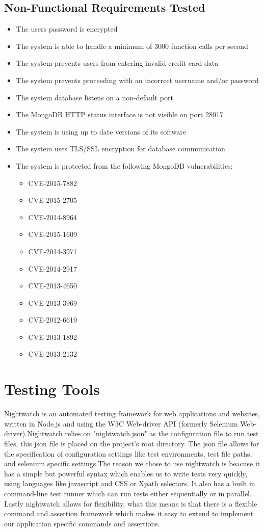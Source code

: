 \documentclass[12pt]{article}
\begin{document}
	\subsection{Non-Functional Requirements Tested}
	\begin{itemize}
		\item The users password is encrypted
		\item The system is able to handle a minimum of 3000 function calls per second
		\item The system prevents users from entering invalid credit card data
		\item The system prevents proceeding with an incorrect username and/or password
		\item The system database listens on a non-default port
		\item The MongoDB HTTP status interface is not visible on port 28017
		\item The system is using up to date versions of its software
		\item The system uses TLS/SSL encryption for database communication
		\item The system is protected from the following MongoDB vulnerabilities:
			\begin{itemize}
				\item CVE-2015-7882
				\item CVE-2015-2705
				\item CVE-2014-8964
				\item CVE-2015-1609
				\item CVE-2014-3971
				\item CVE-2014-2917
				\item CVE-2013-4650
				\item CVE-2013-3969
				\item CVE-2012-6619
				\item CVE-2013-1892
				\item CVE-2013-2132
			\end{itemize}
	\end{itemize}
	
	\section{Testing Tools}
	Nightwatch is an automated testing framework for web applications and websites, written in Node.js and using the W3C Web-driver API (formerly Selenium Web-driver).Nightwatch relies on "nightwatch.json" as the configuration file to run test files, this json file is placed on the project's root directory. The json file allows for the specification of configuration settings like test environments, test file paths, and selenium specific settings.The reason we chose to use nightwatch is beacuse it has a simple but powerful syntax which enables us to write tests very quickly, using languages like javascript and CSS or Xpath selectors. It also has a built in command-line test runner which can run tests either sequentially or in parallel. Lastly nightwatch allows for flexibility, what this means is that there is a flexible command and assertion framework which makes it easy to extend to implement our application specific commands and assertions.
	
\end{document}
